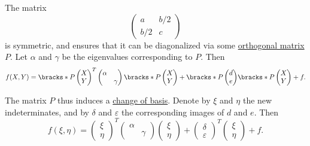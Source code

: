\begin{algorithm}
  The matrix
  \begin{equation*}
    \begin{pmatrix}
      a          & b / 2 \\
      b / 2 & c
    \end{pmatrix}
  \end{equation*}
  is symmetric, and  ensures that it can be diagonalized via some \hyperref[def:unitary_matrix]{orthogonal matrix} \( P \). Let \( \alpha \) and \( \gamma \) be the eigenvalues corresponding to \( P \). Then
  \begin{equation*}
    f(X, Y)
    =
    \bracks*
      {
        P
        \begin{pmatrix}
          X \\ Y
        \end{pmatrix}
      }^T
    \begin{pmatrix}
      \alpha &       \\
             & \gamma
    \end{pmatrix}
    \bracks*
      {
        P
        \begin{pmatrix}
          X \\ Y
        \end{pmatrix}
      }
    +
    \bracks*
      {
        P
        \begin{pmatrix}
          d \\ e
        \end{pmatrix}
      }
    \bracks*
      {
        P
        \begin{pmatrix}
          X \\ Y
        \end{pmatrix}
      }
    +
    f.
  \end{equation*}

  The matrix \( P \) thus induces a \hyperref[con:change_of_basis]{change of basis}. Denote by \( \xi \) and \( \eta \) the new indeterminates, and by \( \delta \) and \( \varepsilon \) the corresponding images of \( d \) and \( e \). Then
  \begin{equation*}
    f(\xi, \eta)
    =
    \begin{pmatrix}
      \xi \\ \eta
    \end{pmatrix}^T
    \begin{pmatrix}
      \alpha &       \\
             & \gamma
    \end{pmatrix}
    \begin{pmatrix}
      \xi \\ \eta
    \end{pmatrix}
    +
    \begin{pmatrix}
      \delta \\ \varepsilon
    \end{pmatrix}^T
    \begin{pmatrix}
      \xi \\ \eta
    \end{pmatrix}
    +
    f.
  \end{equation*}


\end{algorithm}
